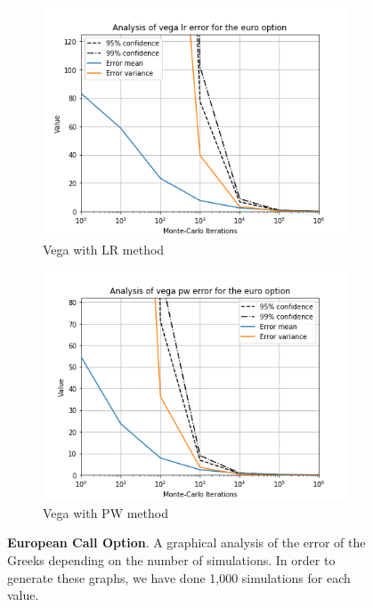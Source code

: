 \documentclass[11pt,a4paper,fleqn]{article}
\begin{document}
\begin{figure}[h!]
      \begin{subfigure}[b]{0.45\textwidth}
          \includegraphics[width=\textwidth]{graphs/eurovegalr.png}
          \caption{Vega with LR method}
      \end{subfigure}
      \begin{subfigure}[b]{0.45\textwidth}
          \includegraphics[width=\textwidth]{graphs/eurovegapw.png}
          \caption{Vega with PW method}
      \end{subfigure}

      \caption{\textbf{European Call Option}. A graphical analysis of the error of the Greeks depending on the number of simulations. In order to generate these graphs, we have done 1,000 simulations for each value.}
\end{figure}
\end{document}
